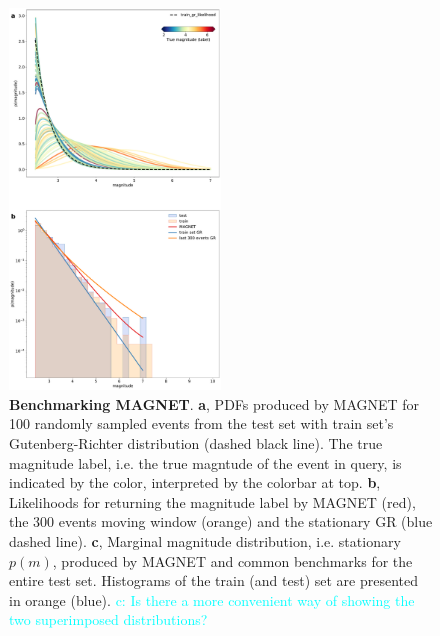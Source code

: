 \documentclass[pdflatex]{sn-jnl}
\newcommand{\neri}[1]{{\textcolor{cyan}{#1}}}
\begin{document}
\begin{figure}[h!]
    \centering
    \includegraphics[width=0.5\textwidth]{figures/raw_results.pdf}
    \caption{
        \textbf{Benchmarking MAGNET}. \textbf{a}, PDFs produced by MAGNET for 100 randomly sampled events from the test set with train set's Gutenberg-Richter distribution (dashed black line). The true magnitude label, i.e. the true magntude of the event in query, is indicated by the color, interpreted by the colorbar at top. \textbf{b}, Likelihoods for returning the magnitude label by MAGNET (red), the 300 events moving window (orange) and the stationary GR (blue dashed line). \textbf{c}, Marginal magnitude distribution, i.e. stationary $p(m)$, produced by MAGNET and common benchmarks for the entire test set. Histograms of the train (and test) set are presented in orange (blue). \neri{c: Is there a more convenient way of showing the two superimposed distributions?}
    }
    \label{fig:model_output}
\end{figure}
\end{document}
